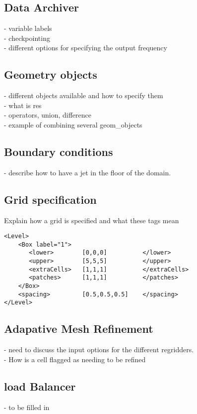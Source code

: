 \subsection{Data Archiver} \label{Sec:DataArchiver}
- variable labels\\
- checkpointing \\
- different options for specifying the output frequency\\
%
\subsection{Geometry objects}
- different objects available and how to specify them\\
- what is res \\
- operators, union, difference\\
- example of combining several geom\_objects\\

\subsection{Boundary conditions}
- describe how to have a jet in the floor of the domain.
%
\subsection{Grid specification} \label{Sec:Grid}
Explain how a grid is specified and what these tags mean

\begin{Verbatim}[fontsize=\footnotesize]
<Level>
    <Box label="1">
       <lower>        [0,0,0]          </lower>
       <upper>        [5,5,5]          </upper>
       <extraCells>   [1,1,1]          </extraCells>
       <patches>      [1,1,1]          </patches>
    </Box>
    <spacing>         [0.5,0.5,0.5]    </spacing>
</Level>
 \end{Verbatim}
%
\subsection{Adapative Mesh Refinement}
- need to discuss the input options for the different regridders.\\
- How is a cell flagged as needing to be refined
%
\subsection{load Balancer}
- to be filled in

